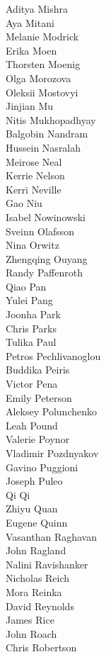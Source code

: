 Aditya Mishra\\
Aya Mitani\\
Melanie Modrick\\
Erika Moen\\
Thorsten Moenig\\
Olga Morozova\\
Oleksii Mostovyi\\
Jinjian Mu\\
Nitis Mukhopadhyay\\
Balgobin Nandram\\
Hussein Nasralah\\
Meirose Neal\\
Kerrie Nelson\\
Kerri Neville\\
Gao Niu\\
Isabel Nowinowski\\
Sveinn Olafsson\\
Nina Orwitz\\
Zhengqing Ouyang\\
Randy Paffenroth\\
Qiao Pan\\
Yulei Pang\\
Joonha Park\\
Chris Parks\\
Tulika Paul\\
Petros Pechlivanoglou\\
Buddika Peiris\\
Victor Pena\\
Emily Peterson\\
Aleksey Polunchenko\\
Leah Pound\\
Valerie Poynor\\
Vladimir Pozdnyakov\\
Gavino Puggioni\\
Joseph Puleo\\
Qi Qi\\
Zhiyu Quan\\
Eugene Quinn\\
Vasanthan Raghavan\\
John Ragland\\
Nalini Ravishanker\\
Nicholas Reich\\
Mora Reinka\\
David Reynolds\\
James Rice\\
John Roach\\
Chris Robertson\\
